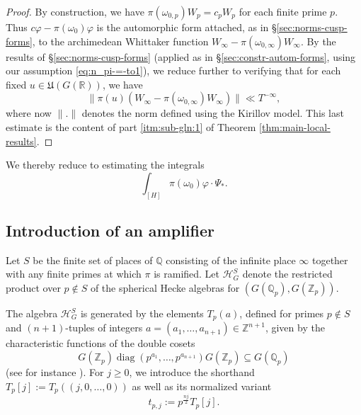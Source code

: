 \documentclass[reqno]{amsart}
\DeclareMathOperator{\diag}{diag}
\theoremstyle{plain} \newtheorem{theorem} {Theorem}
\theoremstyle{definition} \newtheorem{definition} [theorem] {Definition}
\theoremstyle{itplain} %
\numberwithin{equation}{section}
\numberwithin{theorem}{section}
\renewcommand{\geq}{\geqslant}
\begin{document}
\begin{proof}
By construction, we have $\pi(\omega_{0,p}) W_p = c_p W_p$ for each finite prime $p$.  Thus $c \varphi - \pi(\omega_0) \varphi$ is the automorphic form attached, as in \S\ref{sec:norms-cusp-forms}, to the archimedean Whittaker function $W_\infty - \pi(\omega_{0,\infty}) W_\infty$.  By the results of \S\ref{sec:norms-cusp-forms} (applied as in \S\ref{sec:constr-autom-forms}, using our assumption \eqref{eq:n_pi-=-to1}), we reduce further to verifying that for each fixed $u \in \mathfrak{U}(G(\mathbb{R}))$, we have
  \begin{equation*}
\|\pi(u) (W_\infty - \pi(\omega_{0,\infty}) W_\infty) \| \ll T^{-\infty},
\end{equation*}
where now $\|.\|$ denotes the norm defined using the Kirillov model.  This last estimate is the content of part \eqref{itm:sub-gln:1} of Theorem \ref{thm:main-local-results}.
\end{proof}

We thereby reduce to estimating the integrals
\begin{equation*}
\int_{[H]} \pi(\omega_0) \varphi \cdot \Psi_{\ast}.
\end{equation*}

\subsection{Introduction of an amplifier}\label{sec:intr-an-ampl}
Let $S$ be the finite set of places of $\mathbb{Q}$ consisting of the infinite place $\infty$ together with any finite primes at which $\pi$ is ramified.  Let $\mathcal{H}_G^S$ denote the restricted product over $p \notin S$ of the spherical Hecke algebras for $(G(\mathbb{Q}_p), G(\mathbb{Z}_p))$.

The algebra $\mathcal{H}_G^S$ is generated by the elements $T_p(a)$, defined for primes $p \notin S$ and $(n+1)$-tuples of integers $a = (a_1,\dotsc,a_{n+1}) \in \mathbb{Z}^{n+1}$, given by the characteristic functions of the double cosets
\begin{equation*}
G(\mathbb{Z}_p) \diag(p^{a_1}, \dotsc, p^{a_{n+1}}) G(\mathbb{Z}_p) \subseteq G(\mathbb{Q}_p)
\end{equation*}
(see for instance \cite[\S5.2.1]{2020arXiv201202187N}).  For $j \geq 0$, we introduce the shorthand $T_p[j] := T_p ((j,0,\dotsc,0))$ as well as its normalized variant
\begin{equation*}
  t_{p,j} := p^{ \frac{n j}{2} } T_p[j].
\end{equation*}
\end{document}
